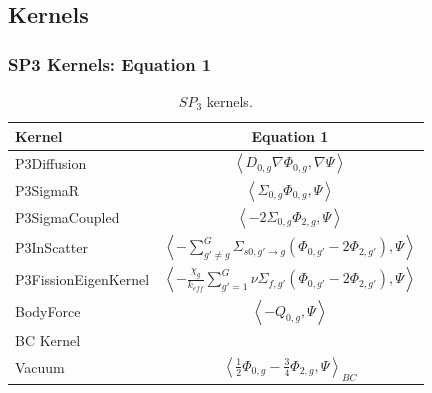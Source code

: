 \subsection{Kernels}
\begin{frame}
\frametitle{SP3 Kernels: Equation 1}

\begin{table}[htbp!]
  \centering
  \caption{$SP_3$ kernels.}
  \begin{tabular}{lc}
  \toprule
  Kernel                & Equation 1 \\
  \midrule
  P3Diffusion           & $\left< D_{0,g} \nabla \Phi_{0,g}, \nabla \Psi \right>$ \\
  P3SigmaR              & $\left< \Sigma_{0,g} \Phi_{0,g}, \Psi \right>$ \\
  P3SigmaCoupled        & $\left< - 2 \Sigma_{0,g} \Phi_{2,g}, \Psi \right>$ \\
  P3InScatter           & $\left< - \sum_{g'\ne g}^G \Sigma_{s0,g' \rightarrow g} \left( \Phi_{0,g'} - 2 \Phi_{2,g'} \right), \Psi \right>$ \\
  P3FissionEigenKernel  & $\left< - \frac{\chi_g}{k_{eff}} \sum_{g'=1}^G \nu\Sigma_{f,g'} \left( \Phi_{0,g'} - 2 \Phi_{2,g'} \right), \Psi \right>$ \\
  BodyForce             & $\left< - Q_{0,g}, \Psi \right>$ \\
  \midrule
  BC Kernel & \\
  \midrule
  Vacuum          & $\left< \frac{1}{2} \Phi_{0,g} - \frac{3}{4} \Phi_{2,g}, \Psi \right>_{BC}$ \\
  \bottomrule
  \end{tabular}
  \label{tab:kernels}
\end{table}
\end{frame}


